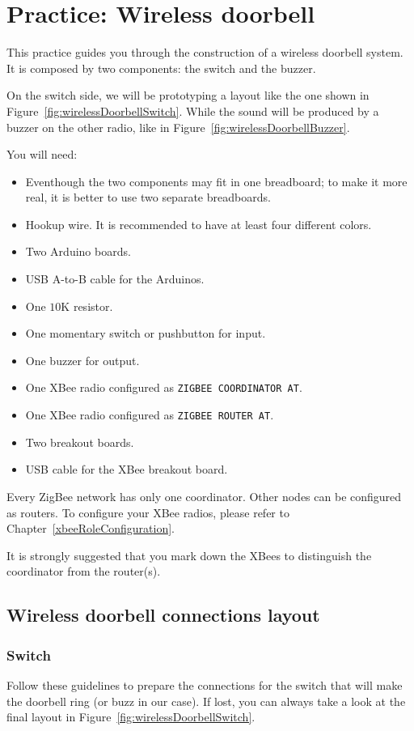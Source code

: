 \section{Practice: Wireless doorbell}\label{pract:wirelessDoorbell}

This practice guides you through the construction of a wireless doorbell system. It is composed by two components: the switch and the buzzer.

On the switch side, we will be prototyping a layout like the one shown in Figure~\ref{fig:wirelessDoorbellSwitch}. While the sound will be produced by a buzzer on the other radio, like in Figure~\ref{fig:wirelessDoorbellBuzzer}.

You will need:

\begin{itemize}
  \item Eventhough the two components may fit in one breadboard; to make it more real, it is better to use two separate breadboards.
  \item Hookup wire. It is recommended to have at least four different colors.
  \item Two Arduino boards.
  \item USB A-to-B cable for the Arduinos.
  \item One $10$K resistor.
  \item One momentary switch or pushbutton for input.
  \item One buzzer for output.
  \item One XBee radio configured as \texttt{ZIGBEE COORDINATOR AT}.
  \item One XBee radio configured as \texttt{ZIGBEE ROUTER AT}.
  \item Two breakout boards.
  \item USB cable for the XBee breakout board.
\end{itemize}

Every ZigBee network has only one coordinator. Other nodes can be configured as routers. To configure your XBee radios, please refer to Chapter~\ref{xbeeRoleConfiguration}.

It is strongly suggested that you mark down the XBees to distinguish the coordinator from the router(s).

\subsection{Wireless doorbell connections layout}

\subsubsection{Switch}
Follow these guidelines to prepare the connections for the switch that will make the doorbell ring (or buzz in our case). If lost, you can always take a look at the final layout in Figure~\ref{fig:wirelessDoorbellSwitch}.

